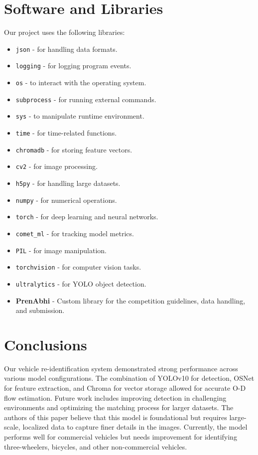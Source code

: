 \documentclass[11pt]{IEEEtran}
\begin{document}
\section{Software and Libraries}
Our project uses the following libraries:
\begin{itemize}
    \item \texttt{json} - for handling data formats.
    \item \texttt{logging} - for logging program events.
    \item \texttt{os} - to interact with the operating system.
    \item \texttt{subprocess} - for running external commands.
    \item \texttt{sys} - to manipulate runtime environment.
    \item \texttt{time} - for time-related functions.
    \item \texttt{chromadb} - for storing feature vectors.
    \item \texttt{cv2} - for image processing.
    \item \texttt{h5py} - for handling large datasets.
    \item \texttt{numpy} - for numerical operations.
    \item \texttt{torch} - for deep learning and neural networks.
    \item \texttt{comet\_ml} - for tracking model metrics.
    \item \texttt{PIL} - for image manipulation.
    \item \texttt{torchvision} - for computer vision tasks.
    \item \texttt{ultralytics} - for YOLO object detection.
    \item \textbf{PrenAbhi} - Custom library for the competition guidelines,
          data handling, and submission.
\end{itemize}

\section{Conclusions}
Our vehicle re-identification system demonstrated strong performance across
various model configurations. The combination of YOLOv10 for detection, OSNet
for feature extraction, and Chroma for vector storage allowed for accurate O-D
flow estimation. Future work includes improving detection in challenging
environments and optimizing the matching process for larger datasets. The
authors of this paper believe that this model is foundational but requires
large-scale, localized data to capture finer details in the images. Currently,
the model performs well for commercial vehicles but needs improvement for
identifying three-wheelers, bicycles, and other non-commercial vehicles.
\end{document}
